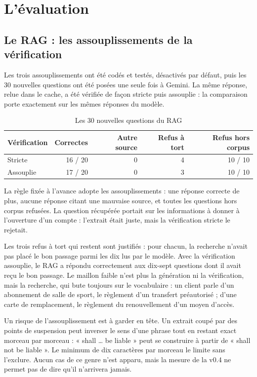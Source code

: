 \documentclass[11pt,a4paper]{article}
\begin{document}
\section{L'évaluation}

\subsection{Le RAG : les assouplissements de la vérification}

Les trois assouplissements ont été codés et testés, désactivés par défaut, puis les 30 nouvelles questions ont été posées une seule fois à Gemini. La même réponse, relue dans le cache, a été vérifiée de façon stricte puis assouplie : la comparaison porte exactement sur les mêmes réponses du modèle.

\begin{table}[H]
\centering\small
\begin{tabular}{@{}l r r r r@{}}
\toprule
Vérification & Correctes & Autre source & Refus à tort & Refus hors corpus \\
\midrule
Stricte & 16 / 20 & 0 & 4 & 10 / 10 \\
Assouplie & 17 / 20 & 0 & 3 & 10 / 10 \\
\bottomrule
\end{tabular}
\caption{Les 30 nouvelles questions du RAG}
\end{table}

La règle fixée à l'avance adopte les assouplissements : une réponse correcte de plus, aucune réponse citant une mauvaise source, et toutes les questions hors corpus refusées. La question récupérée portait sur les informations à donner à l'ouverture d'un compte : l'extrait était juste, mais la vérification stricte le rejetait.

Les trois refus à tort qui restent sont justifiés : pour chacun, la recherche n'avait pas placé le bon passage parmi les dix lus par le modèle. Avec la vérification assouplie, le RAG a répondu correctement aux dix-sept questions dont il avait reçu le bon passage. Le maillon faible n'est plus la génération ni la vérification, mais la recherche, qui bute toujours sur le vocabulaire : un client parle d'un abonnement de salle de sport, le règlement d'un transfert préautorisé ; d'une carte de remplacement, le règlement du renouvellement d'un moyen d'accès.

Un risque de l'assouplissement est à garder en tête. Un extrait coupé par des points de suspension peut inverser le sens d'une phrase tout en restant exact morceau par morceau : « shall \dots{} be liable » peut se construire à partir de « shall not be liable ». Le minimum de dix caractères par morceau le limite sans l'exclure. Aucun cas de ce genre n'est apparu, mais la mesure de la v0.4 ne permet pas de dire qu'il n'arrivera jamais.
\end{document}
